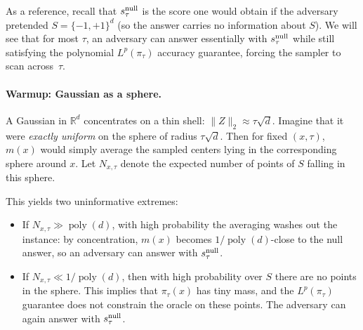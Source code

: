 \documentclass[11pt,letterpaper]{article}
\newcommand{\R}{\mathbb{R}}
\DeclareMathOperator*{\poly}{poly}
\newcommand{\1}{\mathbbm{1}}
\newcommand{\Hd}{\{-1,+1\}^d}
\begin{document}
As a reference,  {recall that} $s^{\rm null}_{ {\tau}}$  {is} the score one would obtain if the adversary pretended $S=\Hd$ (so the answer carries no information about $S$).
We will see that for most $ {\tau}$, an adversary can answer essentially with $s^{\rm null}_{ {\tau}}$ while still satisfying the polynomial $L^p(\pi_{ {\tau}})$ accuracy guarantee, forcing the sampler to scan across~$ {\tau}$.
 
 
\paragraph{Warmup: Gaussian as a sphere.}
A Gaussian in $\R^d$ concentrates on a thin shell: $\|Z\|_2\approx  {\tau}\sqrt d$.
Imagine that it were \emph{exactly uniform} on the sphere of radius $ {\tau}\sqrt d$.
Then for fixed $(x, {\tau})$, $m(x)$ would simply average the sampled centers lying in the corresponding sphere around $x$.
Let $N_{x, \tau}$ denote the expected number of points of $S$ falling in this sphere.
 
This yields two uninformative extremes:
\begin{itemize}
\item 
If $N_{x, \tau}\gg \poly(d)$, with high probability the averaging washes out the instance: by concentration, $m(x)$ becomes $1/\poly(d)$-close to the null answer, so an adversary can answer with $s^{\rm null}_{ {\tau}}$.
\item 
If $N_{x, \tau}\ll 1/\poly(d)$, then with high probability over $S$ there are no points in the sphere. This implies that $\pi_{ {\tau}}(x)$ has tiny mass, and the $L^p(\pi_{ {\tau}})$ guarantee does not constrain the oracle on these points. The adversary can again answer with $s^{\rm null}_{ {\tau}}$.
\end{itemize}
\end{document}
